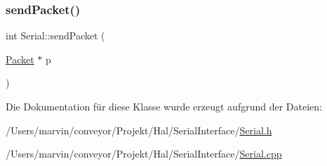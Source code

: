 \hypertarget{class_serial_a18fe9cf8fc366e6691b6ddf5e9b473a1}{}\label{class_serial_a18fe9cf8fc366e6691b6ddf5e9b473a1} 
\subsubsection{\texorpdfstring{send\+Packet()}{sendPacket()}}
{\footnotesize\ttfamily int Serial\+::send\+Packet (\begin{DoxyParamCaption}\item[{\hyperlink{struct_packet}{Packet} $\ast$}]{p }\end{DoxyParamCaption})}



Die Dokumentation für diese Klasse wurde erzeugt aufgrund der Dateien\+:\begin{DoxyCompactItemize}
\item 
/\+Users/marvin/conveyor/\+Projekt/\+Hal/\+Serial\+Interface/\hyperlink{_serial_8h}{Serial.\+h}\item 
/\+Users/marvin/conveyor/\+Projekt/\+Hal/\+Serial\+Interface/\hyperlink{_serial_8cpp}{Serial.\+cpp}\end{DoxyCompactItemize}

